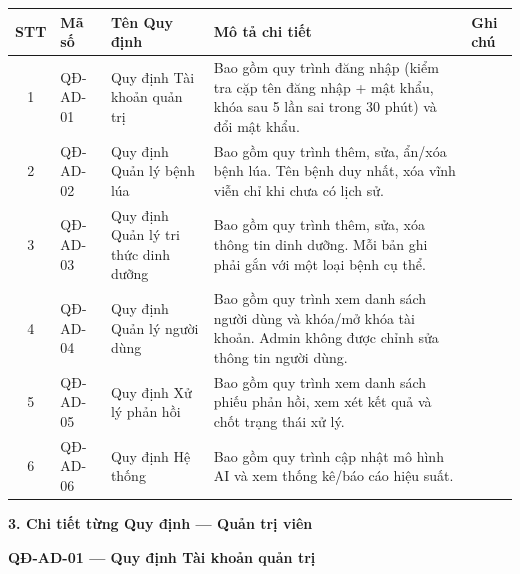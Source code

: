 \documentclass[12pt,a4paper]{article}
\begin{document}
\begin{longtable}{|
        c|
        >{\raggedright\arraybackslash}p{1.8cm}|
        >{\raggedright\arraybackslash}p{3.4cm}|
        >{\raggedright\arraybackslash}p{6.4cm}|
        >{\raggedright\arraybackslash}p{1.4cm}|}
    \hline
    \rowcolor{headerblue}
    \textbf{STT} & \textbf{Mã số} & \textbf{Tên Quy định}                & \textbf{Mô tả chi tiết}                                                                                                & \textbf{Ghi chú} \\
    \hline
    \endhead
    1            & QĐ-AD-01       & Quy định Tài khoản quản trị          & Bao gồm quy trình đăng nhập (kiểm tra cặp tên đăng nhập + mật khẩu, khóa sau 5 lần sai trong 30 phút) và đổi mật khẩu. &                  \\
    \hline
    2            & QĐ-AD-02       & Quy định Quản lý bệnh lúa            & Bao gồm quy trình thêm, sửa, ẩn/xóa bệnh lúa. Tên bệnh duy nhất, xóa vĩnh viễn chỉ khi chưa có lịch sử.                &                  \\
    \hline
    3            & QĐ-AD-03       & Quy định Quản lý tri thức dinh dưỡng & Bao gồm quy trình thêm, sửa, xóa thông tin dinh dưỡng. Mỗi bản ghi phải gắn với một loại bệnh cụ thể.                  &                  \\
    \hline
    4            & QĐ-AD-04       & Quy định Quản lý người dùng          & Bao gồm quy trình xem danh sách người dùng và khóa/mở khóa tài khoản. Admin không được chỉnh sửa thông tin người dùng. &                  \\
    \hline
    5            & QĐ-AD-05       & Quy định Xử lý phản hồi              & Bao gồm quy trình xem danh sách phiếu phản hồi, xem xét kết quả và chốt trạng thái xử lý.                              &                  \\
    \hline
    6            & QĐ-AD-06       & Quy định Hệ thống                    & Bao gồm quy trình cập nhật mô hình AI và xem thống kê/báo cáo hiệu suất.                                               &                  \\
    \hline
\end{longtable}

\vspace{0.3cm}
\textbf{3. Chi tiết từng Quy định --- Quản trị viên}

\vspace{0.3cm}
\noindent\textbf{QĐ-AD-01 --- Quy định Tài khoản quản trị}
\end{document}
